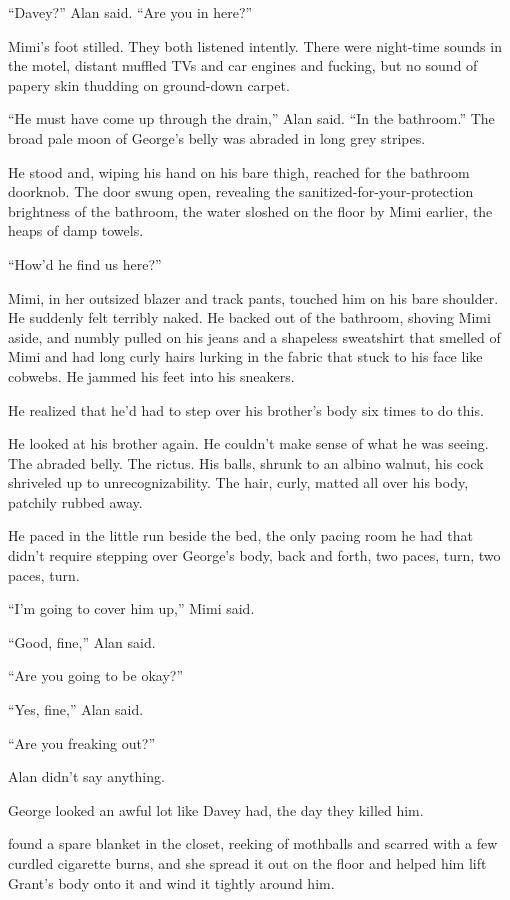 ``Davey?'' Alan said.  ``Are you in here?''

Mimi's foot stilled.  They both listened intently.  There were
night-time sounds in the motel, distant muffled TVs and car engines
and fucking, but no sound of papery skin thudding on ground-down
carpet.

``He must have come up through the drain,'' Alan said.  ``In the
bathroom.'' The broad pale moon of George's belly was abraded in long
grey stripes.

He stood and, wiping his hand on his bare thigh, reached for the
bathroom doorknob.  The door swung open, revealing the
sanitized-for-your-protection brightness of the bathroom, the water
sloshed on the floor by Mimi earlier, the heaps of damp towels.

``How'd he find us here?''

Mimi, in her outsized blazer and track pants, touched him on his bare
shoulder.  He suddenly felt terribly naked.  He backed out of the
bathroom, shoving Mimi aside, and numbly pulled on his jeans and a
shapeless sweatshirt that smelled of Mimi and had long curly hairs
lurking in the fabric that stuck to his face like cobwebs.  He jammed
his feet into his sneakers.

He realized that he'd had to step over his brother's body six times to
do this.

He looked at his brother again.  He couldn't make sense of what he was
seeing.  The abraded belly.  The rictus.  His balls, shrunk to an
albino walnut, his cock shriveled up to unrecognizability.  The hair,
curly, matted all over his body, patchily rubbed away.

He paced in the little run beside the bed, the only pacing room he had
that didn't require stepping over George's body, back and forth, two
paces, turn, two paces, turn.

``I'm going to cover him up,'' Mimi said.

``Good, fine,'' Alan said.

``Are you going to be okay?''

``Yes, fine,'' Alan said.

``Are you freaking out?''

Alan didn't say anything.

George looked an awful lot like Davey had, the day they killed him.

 found a spare blanket in the closet, reeking of mothballs and
scarred with a few curdled cigarette burns, and she spread it out on
the floor and helped him lift Grant's body onto it and wind it tightly
around him.

